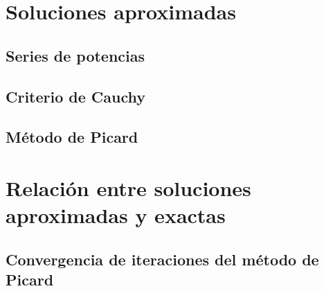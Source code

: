 \newpage
\section{Soluciones aproximadas}

	\subsection{Series de potencias}

	\newpage
	\subsection{Criterio de Cauchy}

	\newpage
	\subsection{Método de Picard}

\newpage
\section{Relación entre soluciones aproximadas y exactas}

	\subsection{Convergencia de iteraciones del método de Picard}
